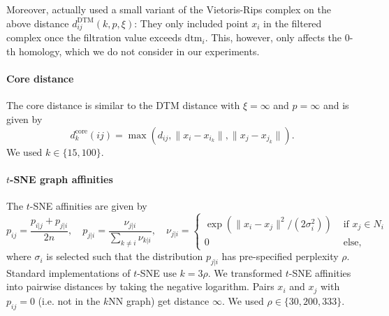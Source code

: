 \documentclass{article}
\theoremstyle{plain}
\theoremstyle{definition}
\theoremstyle{remark}
\begin{document}
Moreover, \citet{anai2020dtm} actually used a small variant of the Vietoris-Rips complex on the above distance $d^{\text{DTM}}_{ij}(k,p,\xi)$: They only included point $x_i$ in the filtered complex once the filtration value exceeds $\text{dtm}_i$. This, however, only affects the $0$-th homology, which we do not consider in our experiments. 

\paragraph{Core distance} 
The core distance is similar to the DTM distance with $\xi=\infty$ and $p=\infty$ and is given by
\begin{equation}
    d^{\text{core}}_k(ij) = \max(d_{ij}, \| x_i - x_{i_k}\|, \| x_j - x_{j_k}\|).
\end{equation}
We used $k\in\{15, 100\}$.

\paragraph{$t$-SNE graph affinities}
The $t$-SNE affinities are given by
\begin{equation}
    p_{ij}= \frac{p_{i|j}+ p_{j|i}}{2n}, \quad
    p_{j|i} = \frac{\nu_{j|i}}{\sum_{k\neq i} \nu_{k|i}}, \quad
    \nu_{j|i} = \begin{cases}
    \exp\left(\| x_i - x_j \|^2/(2\sigma_i^2)\right)  &\text{ if } x_j \in N_i  \\
        0  & \text{ else,}   \end{cases}
\end{equation}
where $\sigma_i$ is selected such that the distribution $p_{j|i}$ has pre-specified perplexity $\rho$. Standard implementations of $t$-SNE use $k=3\rho$. We transformed $t$-SNE affinities into pairwise distances by taking the negative logarithm. Pairs $x_i$ and $x_j$ with $p_{ij} = 0$ (i.e. not in the $k$NN graph) get distance $\infty$. We used $\rho\in\{30, 200, 333\}$.
\end{document}
